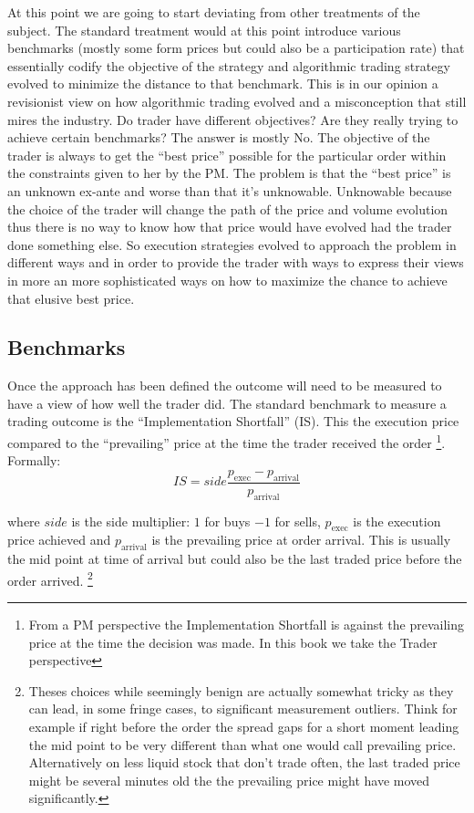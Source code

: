At this point we are going to start deviating from other treatments of the subject. The standard treatment would at this point introduce various benchmarks (mostly some form prices but could also be a participation rate) that essentially codify the objective of the strategy and algorithmic trading strategy evolved to minimize the distance to that benchmark. This is in our opinion a revisionist view on how algorithmic trading evolved and a misconception that still mires the industry. Do trader have different objectives? Are they really trying to achieve certain benchmarks? The answer is mostly No. The objective of the trader is always to get the ``best price'' possible for the particular order within the constraints given to her by the PM. The problem is that the ``best price''  is an unknown ex-ante and worse than that it's unknowable. Unknowable because the choice of the trader will change the path of the price and volume evolution thus there is no way to know how that price would have evolved had the trader done something else. So execution strategies evolved to approach the problem in  different ways  and in order to provide the trader with ways to express their views in more an more sophisticated ways on how to maximize the chance to achieve that elusive best price.\\


\subsection{Benchmarks}

Once the approach has been defined the outcome will need to be measured to have a view of how well the trader did. The standard benchmark to measure a trading outcome is the ``Implementation Shortfall'' (IS). This the execution price compared to the ``prevailing'' price at the time the trader received the order \footnote{From a PM perspective the Implementation Shortfall is against the prevailing price at the time the decision was made. In this book we take the Trader perspective}. Formally:
\begin{equation}
	\mathit{IS} = \mathit{side}\frac{p_{\text{exec}} - p_{\text{arrival}}}{p_{\text{arrival}}}
\end{equation}

where $side$ is the side multiplier: $1$ for buys $-1$ for sells, $p_{\text{exec}}$ is the execution price achieved and $p_{\text{arrival}}$ is the prevailing price at order arrival. This is usually the mid point at time of arrival but could also be the last traded price before the order arrived. \footnote{Theses choices while seemingly benign are actually somewhat tricky as they can lead, in some fringe cases, to significant measurement outliers. Think for example if right before the order the spread gaps for a short moment leading the mid point to be very different than what one would call prevailing price. Alternatively on less liquid stock that don't trade often, the last traded price might be several minutes old the the prevailing price might have moved significantly.}

